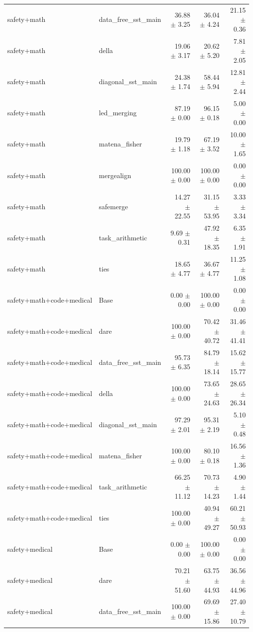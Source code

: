 \begin{table}[H]
{\begin{tabular}{llrrr}
safety+math & data\_free\_sst\_main & 36.88 $\pm$ 3.25 & 36.04 $\pm$ 4.24 & 21.15 $\pm$ 0.36 \\
safety+math & della & 19.06 $\pm$ 3.17 & 20.62 $\pm$ 5.20 & 7.81 $\pm$ 2.05 \\
safety+math & diagonal\_sst\_main & 24.38 $\pm$ 1.74 & 58.44 $\pm$ 5.94 & 12.81 $\pm$ 2.44 \\
safety+math & led\_merging & 87.19 $\pm$ 0.00 & 96.15 $\pm$ 0.18 & 5.00 $\pm$ 0.00 \\
safety+math & matena\_fisher & 19.79 $\pm$ 1.18 & 67.19 $\pm$ 3.52 & 10.00 $\pm$ 1.65 \\
safety+math & mergealign & 100.00 $\pm$ 0.00 & 100.00 $\pm$ 0.00 & 0.00 $\pm$ 0.00 \\
safety+math & safemerge & 14.27 $\pm$ 22.55 & 31.15 $\pm$ 53.95 & 3.33 $\pm$ 3.34 \\
safety+math & task\_arithmetic & 9.69 $\pm$ 0.31 & 47.92 $\pm$ 18.35 & 6.35 $\pm$ 1.91 \\
safety+math & ties & 18.65 $\pm$ 4.77 & 36.67 $\pm$ 4.77 & 11.25 $\pm$ 1.08 \\
safety+math+code+medical & Base & 0.00 $\pm$ 0.00 & 100.00 $\pm$ 0.00 & 0.00 $\pm$ 0.00 \\
safety+math+code+medical & dare & 100.00 $\pm$ 0.00 & 70.42 $\pm$ 40.72 & 31.46 $\pm$ 41.41 \\
safety+math+code+medical & data\_free\_sst\_main & 95.73 $\pm$ 6.35 & 84.79 $\pm$ 18.14 & 15.62 $\pm$ 15.77 \\
safety+math+code+medical & della & 100.00 $\pm$ 0.00 & 73.65 $\pm$ 24.63 & 28.65 $\pm$ 26.34 \\
safety+math+code+medical & diagonal\_sst\_main & 97.29 $\pm$ 2.01 & 95.31 $\pm$ 2.19 & 5.10 $\pm$ 0.48 \\
safety+math+code+medical & matena\_fisher & 100.00 $\pm$ 0.00 & 80.10 $\pm$ 0.18 & 16.56 $\pm$ 1.36 \\
safety+math+code+medical & task\_arithmetic & 66.25 $\pm$ 11.12 & 70.73 $\pm$ 14.23 & 4.90 $\pm$ 1.44 \\
safety+math+code+medical & ties & 100.00 $\pm$ 0.00 & 40.94 $\pm$ 49.27 & 60.21 $\pm$ 50.93 \\
safety+medical & Base & 0.00 $\pm$ 0.00 & 100.00 $\pm$ 0.00 & 0.00 $\pm$ 0.00 \\
safety+medical & dare & 70.21 $\pm$ 51.60 & 63.75 $\pm$ 44.93 & 36.56 $\pm$ 44.96 \\
safety+medical & data\_free\_sst\_main & 100.00 $\pm$ 0.00 & 69.69 $\pm$ 15.86 & 27.40 $\pm$ 10.79 \\

\end{tabular}}
\end{table}
